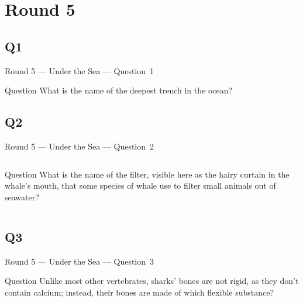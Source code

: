 \documentclass[11pt,draft]{beamer}
\begin{document}
\section{Round 5}
\subsection*{Q1}
\begin{frame}[t]{Round 5 --- Under the Sea --- \mbox{Question 1}}
    \begin{block}{Question}
        What is the name of the deepest trench in the ocean?
    \end{block}
\end{frame}
\subsection*{Q2}
\begin{frame}[t]{Round 5 --- Under the Sea --- \mbox{Question 2}}
    \begin{columns}[T,totalwidth=\linewidth]
        \begin{column}{0.32\linewidth}
            \begin{block}{Question}
                What is the name of the filter, visible here as the hairy curtain in the whale's mouth, that some species of whale use to filter small animals out of seawater?
            \end{block}
        \end{column}
        \begin{column}{0.65\linewidth}
            \begin{center}
                \texttt{[image: \{Images/baleen]}.jpg}
            \end{center}
        \end{column}
    \end{columns}
\end{frame}
\subsection*{Q3}
\begin{frame}[t]{Round 5 --- Under the Sea --- \mbox{Question 3}}
    \begin{block}{Question}
        Unlike most other vertebrates, sharks' bones are not rigid, as they don't contain calcium; instead, their bones are made of which flexible substance?
    \end{block}
\end{frame}
\end{document}
